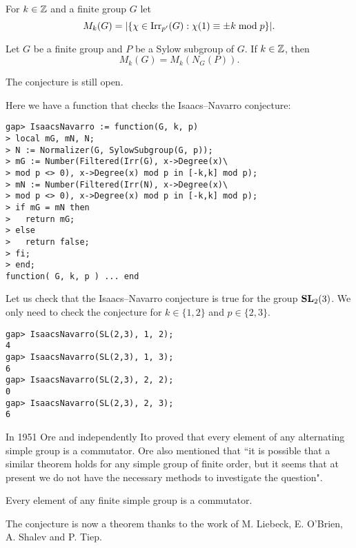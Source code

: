 For $k\in\mathbb{Z}$ and a finite group $G$ let
\[
  M_k(G)=|\{\chi\in\operatorname{Irr}_{p'}(G):\chi(1)\equiv\pm k\bmod p\}|.
\]

\begin{conjecture}
Let $G$ be a finite group and $P$ be a Sylow subgroup
of $G$. If $k\in\mathbb{Z}$, then 
\[
    M_k(G)=M_k(N_G(P)).
\]
\end{conjecture}

The conjecture is still open. 

\begin{example}
Here we have a function that checks the Isaacs--Navarro conjecture:
\begin{lstlisting}
gap> IsaacsNavarro := function(G, k, p)
> local mG, mN, N;
> N := Normalizer(G, SylowSubgroup(G, p));
> mG := Number(Filtered(Irr(G), x->Degree(x)\
> mod p <> 0), x->Degree(x) mod p in [-k,k] mod p);
> mN := Number(Filtered(Irr(N), x->Degree(x)\
> mod p <> 0), x->Degree(x) mod p in [-k,k] mod p);
> if mG = mN then
>   return mG;
> else
>   return false;
> fi;
> end;
function( G, k, p ) ... end
\end{lstlisting}

Let us check that the Isaacs--Navarro conjecture is true for the group
$\mathbf{SL}_2(3)$. We only need to check the conjecture for $k\in\{1,2\}$ and
$p\in\{2,3\}$. 
\begin{lstlisting}
gap> IsaacsNavarro(SL(2,3), 1, 2);
4
gap> IsaacsNavarro(SL(2,3), 1, 3);
6
gap> IsaacsNavarro(SL(2,3), 2, 2);
0
gap> IsaacsNavarro(SL(2,3), 2, 3);
6
\end{lstlisting}
\end{example}

In 1951 Ore and independently Ito
proved that every element of any alternating simple group is a commutator. Ore also mentioned that ``it is possible that a similar theorem holds for any simple group of finite order, but it seems that at present we do not have the necessary methods to investigate the question". 

\begin{conjecture}[Ore]
    Every element of any finite simple group is a commutator.
\end{conjecture}

The conjecture is now a theorem thanks 
to the work of M. Liebeck, E. O'Brien, A. Shalev and P. Tiep. 

